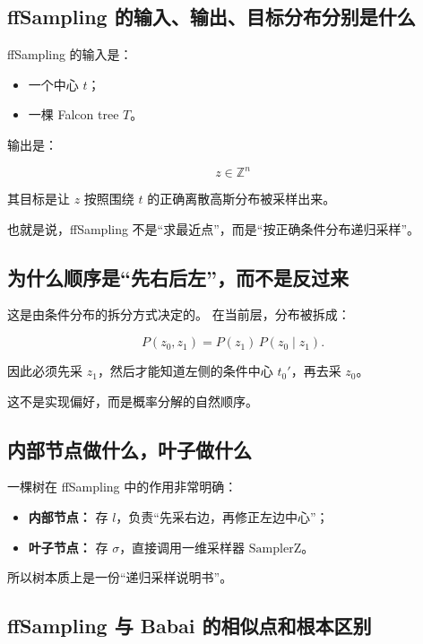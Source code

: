 \documentclass[11pt,a4paper]{ctexart}
\begin{document}
\subsection{ffSampling 的输入、输出、目标分布分别是什么}

ffSampling 的输入是：

\begin{itemize}
    \item 一个中心 \(t\)；
    \item 一棵 Falcon tree \(T\)。
\end{itemize}

输出是：

\[
z\in \mathbb Z^n
\]

其目标是让 \(z\) 按照围绕 \(t\) 的正确离散高斯分布被采样出来。

也就是说，ffSampling 不是“求最近点”，而是“按正确条件分布递归采样”。

\subsection{为什么顺序是“先右后左”，而不是反过来}

这是由条件分布的拆分方式决定的。  
在当前层，分布被拆成：

\[
P(z_0,z_1)=P(z_1)\,P(z_0\mid z_1).
\]

因此必须先采 \(z_1\)，然后才能知道左侧的条件中心 \(t_0'\)，再去采 \(z_0\)。

这不是实现偏好，而是概率分解的自然顺序。

\subsection{内部节点做什么，叶子做什么}

一棵树在 ffSampling 中的作用非常明确：

\begin{itemize}
    \item \textbf{内部节点：} 存 \(l\)，负责“先采右边，再修正左边中心”；
    \item \textbf{叶子节点：} 存 \(\sigma\)，直接调用一维采样器 \(\mathrm{SamplerZ}\)。
\end{itemize}

所以树本质上是一份“递归采样说明书”。

\subsection{ffSampling 与 Babai 的相似点和根本区别}
\end{document}
